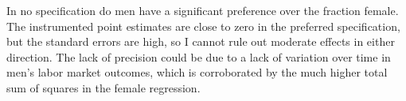 \documentclass[12pt]{article}
\begin{document}
In no specification do men have a significant preference over the fraction female. The instrumented point estimates are close to zero in the preferred specification, but the standard errors are high, so I cannot rule out moderate effects in either direction. The lack of precision could be due to a lack of variation over time in men's labor market outcomes, which is corroborated by the much higher total sum of squares in the female regression.










\end{document}

